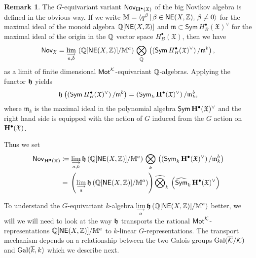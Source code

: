 \documentclass[twoside,leqno]{article}
\numberwithin{equation}{section}
\theoremstyle{plain}
\theoremstyle{definition}
\newtheorem{remark}[equation]{Remark}
\begin{document}
\begin{remark}
The $G$-equivariant variant
      $\mathsf{Nov}_{\mathbf{H}^{\bullet}(\mathfrak{X})}$ of the big Novikov
      algebra is defined in the obvious way. If we write $\mathbb{M} =
      \langle q^{\beta} \, | \, \beta \in \mathsf{NE}(X,\mathbb Z), \,
      \beta \neq 0 \rangle$ for the maximal ideal of the monoid
      algebra $\mathbb Q[\mathsf{NE}(X,\mathbb Z)]$ and $\mathfrak{m} \subset
      \mathsf{Sym} \, H^{\bullet}_{B}(\mathfrak{X})^{\vee}$ for the
      maximal ideal of the origin in the $\mathbb Q$ vector space
      $H^{\bullet}_{B}(\mathfrak{X})$, then we have
      \[
      \mathsf{Nov}_{\mathfrak{X}} = \lim_{\substack{\longrightarrow \\ a,b}} \,
      \left(\mathbb Q[\mathsf{NE}(X,\mathbb Z)]/\mathbb{M}^{a}\right) \,
      \bigotimes_{\mathbb Q} \, \left( \left(\mathsf{Sym} \,
      H^{\bullet}_{B}(\mathfrak{X})^{\vee}\right)/\mathfrak{m}^{b}\right),
      \]
 as a limit of finite dimensional $\mathsf{Mot}^{\mathcal K}$-equivariant
 $\mathbb Q$-algebras.
 Applying the functor $\boldsymbol{\mathfrak{h}}$ yields
 \[
 \boldsymbol{\mathfrak{h}}\left( \left(\mathsf{Sym} \,
 H^{\bullet}_{B}(\mathfrak{X})^{\vee}\right)/\mathfrak{m}^{b}\right) =
 \left(\mathsf{Sym}_{k} \,
 \mathbf{H}^{\bullet}(\mathfrak{X})^{\vee}\right)/\mathfrak{m}_{k}^{b},
 \]
 where $\mathfrak{m}_{k}$ is the maximal ideal in the polynomial
 algebra $\mathsf{Sym} \, \mathbf{H}^{\bullet}(\mathfrak{X})^{\vee}$ and the
 right hand side is equipped with the action of $G$ induced from the
 $G$ action on $\mathbf{H}^{\bullet}(\mathfrak{X})$.

 Thus we set
 \[
 \begin{aligned}
 \mathsf{Nov}_{\mathbf{H}^{\bullet}(\mathfrak{X})} & \coloneqq\lim_{\substack{\longrightarrow \\ a,b}}
 \boldsymbol{\mathfrak{h}} \left(\mathbb Q[\mathsf{NE}(X,\mathbb Z)]/\mathbb{M}^{a}\right) \,
 \bigotimes_{k} \,
 \left(\left(\mathsf{Sym}_{k} \,
 \mathbf{H}^{\bullet}(\mathfrak{X})^{\vee}\right)/\mathfrak{m}_{k}^{b}\right)  \\
 & = \, \left( \lim_{\substack{\longrightarrow \\ a  }}
 \boldsymbol{\mathfrak{h}} \left(\mathbb Q[\mathsf{NE}(X,\mathbb Z)]/\mathbb{M}^{a}\right)\right)
 \widehat{\bigotimes}_{k} \, \left(\widehat{\mathsf{Sym}}_{k} \,
 \mathbf{H}^{\bullet}(\mathfrak{X})^{\vee}\right)
 \end{aligned}
 \]

To understand the $G$-equivariant $k$-algebra
${\displaystyle \lim_{\substack{\longrightarrow \\ a}} \boldsymbol{\mathfrak{h}}
  \left(\mathbb Q[\mathsf{NE}(X,\mathbb Z)]/\mathbb{M}^{a}\right)}$ better, we
will we will need to look at the way $\boldsymbol{\mathfrak{h}}$ transports the rational
$\mathsf{Mot}^{\mathcal K}$-representations
$\mathbb Q[\mathsf{NE}(X,\mathbb Z)]/\mathbb{M}^{a}$ to $k$-linear
$G$-representations. The transport mechanism depends on a relationship
between the two Galois groups $\operatorname{Gal}(\overline{\mathcal K}/\mathcal K)$ and $\operatorname{Gal}(\overline{k},k)$
which we describe next.
\end{remark}
\end{document}
